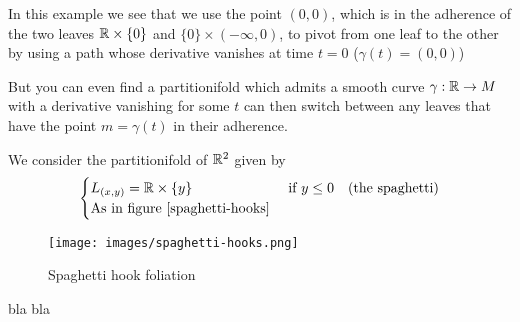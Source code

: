 	In this example we see that we use the point $(0,0)$, which is in the adherence of the two leaves $\mathbb{R} \times \{0\}$ and $\{0\} \times (-\infty, 0)$, to pivot from one leaf to the other by using a path whose derivative vanishes at time $t=0$ ($\gamma(t) = (0,0)$)

	But you can even find a partitionifold which admits a smooth curve $\gamma: \mathbb{R} \to M$ with a derivative vanishing for some $t$ can then switch between any leaves that have the point $m = \gamma(t)$ in their adherence.

	\begin{example}
		We consider the partitionifold of $\mathbb{R}^2$ given by
		$$
		\begin{cases}
			L_{(x,y)} = \mathbb{R} \times \{y\}            &\text{ if } y \leq 0 \quad \text{(the spaghetti)} \\
			\text{As in figure \ref{spaghetti-hooks}}
		\end{cases}
		$$
	\end{example}

    \begin{figure}[H]
        \centering
        \texttt{[image: images/spaghetti-hooks.png]}
        \caption{Spaghetti hook foliation}
        \label{spaghetti-hooks}
    \end{figure}

    \begin{prop}
		    bla bla
    \end{prop}

